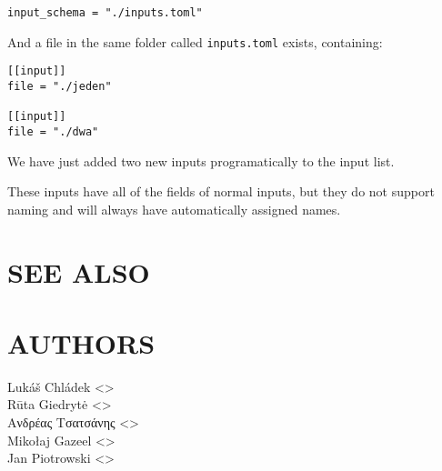 \documentclass[a4paper,english]{article}
\begin{document}
\begin{adjustwidth}{18pt}{0pt}
            \begin{verbatim}
input_schema = "./inputs.toml"
            \end{verbatim}
            And a file in the same folder called \texttt{inputs.toml}
            exists, containing:

            \begin{verbatim}
[[input]]
file = "./jeden"

[[input]]
file = "./dwa"
            \end{verbatim}
            We have just added two new inputs programatically to the input list.

            These inputs have all of the fields of normal inputs, but
            they do not support naming and will always have automatically assigned
            names.

  \section{SEE ALSO}
       

  \section{AUTHORS}
    Lukáš Chládek <>\\[0.1cm]\MANbr
    Rūta Giedrytė <>\\[0.1cm]\MANbr
    Ανδρέας Τσατσάνης <>\\[0.1cm]\MANbr
    Mikołaj Gazeel <>\\[0.1cm]\MANbr
    Jan Piotrowski <>
\end{adjustwidth}
\end{document}
